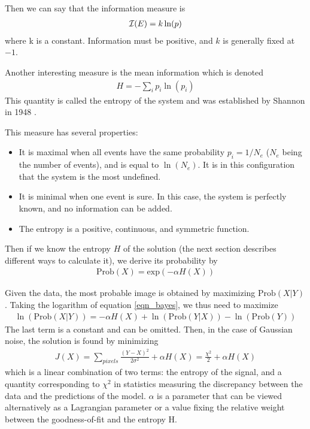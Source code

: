 \documentclass[11pt,a4paper]{article}
\begin{document}
Then we can say that the information measure is
\begin{eqnarray}
{\cal I}(E) = k \ln(p)
\end{eqnarray}
where k is a constant. Information must be positive, and $k$
is generally fixed at $-1$.

Another interesting measure is the mean information which is denoted
\begin{eqnarray}
H = - \sum_i p_i \ln(p_i)
\end{eqnarray}
This quantity is called the entropy of the system and was established by 
Shannon in 1948 \cite{shannon48}.

This measure has several properties:
\begin{itemize}
\item It is maximal when all events have the same probability 
$p_i = 1/ N_e$ ($N_e$ being the number of events), and is equal to 
$\ln(N_e)$. It is in this 
configuration that the system is the most undefined.
\item It is minimal when one event is sure. In this case, the system is 
perfectly known, and no information can be added.
\item The entropy is a positive, continuous, and symmetric function.
\end{itemize}

Then if we know the entropy $H$ of the solution (the next section 
describes different ways to calculate it), 
we derive its probability by
\begin{eqnarray}
\mathrm{Prob}(X) = \mathrm{exp}(- \alpha H(X))
\label{info_prop}
\end{eqnarray}

Given the data, the most probable image is obtained by maximizing
$\mathrm{Prob}(X|Y)$. Taking the logarithm of equation \ref{eqn_bayes}, we 
thus need to maximize
\begin{eqnarray}
 \ln (\mathrm{Prob}(X|Y))  = - \alpha  H(X) + \ln(\mathrm{Prob}(Y|X)) - 
\ln(\mathrm{Prob}(Y))
\end{eqnarray}
The last term is a constant and can be omitted.
Then, in the case of Gaussian noise, the solution is found by minimizing 
\begin{eqnarray}
J(X) = \sum_{pixels} \frac{{(Y-X)}^{2}}{2 {\sigma}^{2}} + {\alpha} H(X)
= \frac{{\chi}^2}{2} + {\alpha} H(X)
\label{eqn_j1}
\end{eqnarray}
which is a linear combination of two terms: the entropy of the signal,
and a quantity corresponding to ${\chi}^2$ in statistics measuring the
discrepancy between the data and the predictions of the model.
$\alpha$ is a parameter that can be viewed alternatively as 
a Lagrangian parameter or a value fixing the relative weight between 
the goodness-of-fit and the entropy H. 
\end{document}

